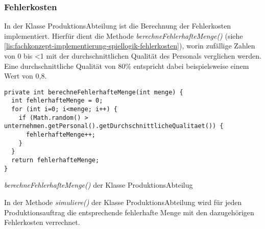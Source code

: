 \subsubsection{Fehlerkosten}
\label{subsub:fachkonzept-implementierung-spiellogik-fehlerkosten}

In der Klasse ProduktionsAbteilung ist die Berechnung der Fehlerkosten implementiert. Hierfür dient die Methode \textit{berechneFehlerhafteMenge()} (siehe \ref{lis:fachkonzept-implementierung-spiellogik-fehlerkosten}), worin zufällige Zahlen von 0 bis <1 mit der durchschnittlichen Qualität des Personals verglichen werden. Eine durchschnittliche Qualität von 80\% entspricht dabei beispielsweise einem Wert von 0,8. 

\begin{programm}[htbp]
\begin{lstlisting}[breaklines=true]
private int berechneFehlerhafteMenge(int menge) {
  int fehlerhafteMenge = 0;
  for (int i=0; i<menge; i++) {
    if (Math.random() > unternehmen.getPersonal().getDurchschnittlicheQualitaet()) {
	  fehlerhafteMenge++;
	}
  }
  return fehlerhafteMenge;
}
\end{lstlisting}
\caption{\textit{berechneFehlerhafteMenge()} der Klasse ProduktionsAbteilug\label{lis:fachkonzept-implementierung-spiellogik-fehlerkosten}}
\end{programm}

In der Methode \textit{simuliere()} der Klasse ProduktionsAbteilung wird für jeden Produktionsauftrag die entsprechende fehlerhafte Menge mit den dazugehörigen Fehlerkosten verrechnet. 




